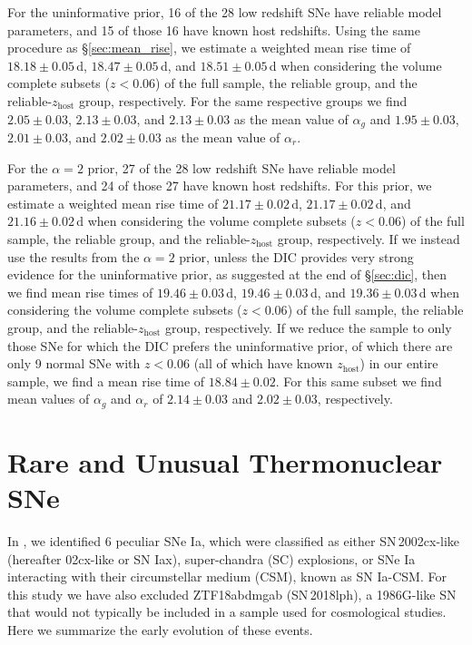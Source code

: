 \documentclass[twocolumn]{./aastex63}
\begin{document}
For the uninformative prior, 16 of the 28 low redshift SNe have reliable model
parameters, and 15 of those 16 have known host redshifts. Using the same
procedure as \S\ref{sec:mean_rise}, we estimate a weighted mean rise time of
$18.18 \pm 0.05$\,d, $18.47 \pm 0.05$\,d, and $18.51 \pm 0.05$\,d when
considering the volume complete subsets ($z < 0.06$) of the full sample, the
reliable group, and the reliable-$z_\mathrm{host}$ group, respectively. For
the same respective groups we find $2.05 \pm 0.03$, $2.13 \pm 0.03$, and $2.13
\pm 0.03$ as the mean value of $\alpha_g$ and $1.95 \pm 0.03$, $2.01 \pm
0.03$, and $2.02 \pm 0.03$ as the mean value of $\alpha_r$.

For the $\alpha = 2$ prior, 27 of the 28 low redshift SNe have reliable model
parameters, and 24 of those 27 have known host redshifts. For this prior, we
estimate a weighted mean rise time of $21.17 \pm 0.02$\,d, $21.17 \pm
0.02$\,d, and $21.16 \pm 0.02$\,d when considering the volume complete subsets
($z < 0.06$) of the full sample, the reliable group, and the
reliable-$z_\mathrm{host}$ group, respectively. If we instead use the results
from the $\alpha = 2$ prior, unless the DIC provides very strong evidence for
the uninformative prior, as suggested at the end of \S\ref{sec:dic}, then we
find mean rise times of $19.46 \pm 0.03$\,d, $19.46 \pm 0.03$\,d, and $19.36
\pm 0.03$\,d when considering the volume complete subsets ($z < 0.06$) of the
full sample, the reliable group, and the reliable-$z_\mathrm{host}$ group,
respectively. If we reduce the sample to only those SNe for which the DIC
prefers the uninformative prior, of which there are only 9 normal SNe with $z
< 0.06$ (all of which have known $z_\mathrm{host}$) in our entire sample, we
find a mean rise time of $18.84 \pm 0.02$. For this same subset we find mean
values of $\alpha_g$ and $\alpha_r$ of $2.14 \pm 0.03$ and $2.02 \pm 0.03$,
respectively.

\section{Rare and Unusual Thermonuclear SNe}

In \citet{Yao19}, we identified 6 peculiar SNe Ia, which were classified as
either SN\,2002cx-like (hereafter 02cx-like or SN Iax), super-chandra (SC)
explosions, or SNe Ia interacting with their circumstellar medium (CSM), known
as SN Ia-CSM. For this study we have also excluded ZTF18abdmgab (SN\,2018lph), a
1986G-like SN that would not typically be included in a sample used for
cosmological studies. Here we summarize the early evolution of these events.
\end{document}
